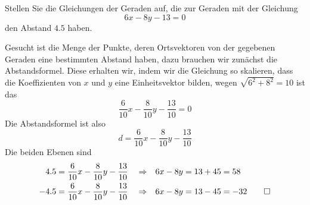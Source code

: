 Stellen Sie die Gleichungen der Geraden auf, die zur Geraden mit der
Gleichung
\[
6x-8y-13=0
\]
den Abstand $4.5$ haben.

\begin{loesung}
Gesucht ist die Menge der Punkte, deren Ortsvektoren von der gegebenen
Geraden eine bestimmten Abstand haben, dazu brauchen wir zunächst die
Abstandsformel. Diese erhalten wir, indem wir die Gleichung so skalieren,
dass die Koeffizienten von $x$ und $y$ eine Einheitsvektor bilden,
wegen $\sqrt{6^2+8^2}=10$ ist das
\[
\frac{6}{10}x-\frac{8}{10}y-\frac{13}{10}=0
\]
Die Abstandsformel ist also
\[
d =\frac{6}{10}x-\frac{8}{10}y-\frac{13}{10}
\]
Die beiden Ebenen sind
\begin{align*}
4.5&=\frac{6}{10}x-\frac{8}{10}y-\frac{13}{10}&&\Rightarrow&
6x-8y&=13+45=58
\\
-4.5&=\frac{6}{10}x-\frac{8}{10}y-\frac{13}{10}&&\Rightarrow&
6x-8y&=13-45=-32
\qedhere
\end{align*}
\end{loesung}

